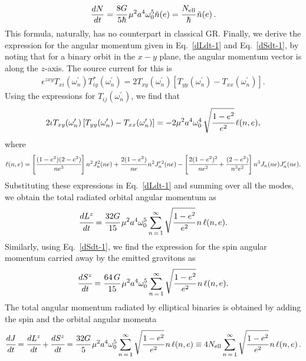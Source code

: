 \documentclass[aps,prd]{revtex4-2}
\begin{document}
\begin{eqnarray}\label{Eq:dN_dt_grav_ellip}
 \frac{dN}{dt} = \cfrac{8G}{5 \hbar}\,\mu^{2}a^{4} \omega_0^{5}\tilde{n}(e) = \cfrac{N_{\rm ell}}{\hbar}\,\tilde{n}(e)\,. 
\end{eqnarray}
 This formula, naturally, has no counterpart in classical GR. Finally, we derive the expression for the angular momentum given in Eq.~\eqref{dLdt-1} and Eq.~\eqref{dSdt-1}, by noting that for a binary orbit in the $x-y$ plane, the angular momentum vector is along the $z$-axis. The source current for this is
\begin{eqnarray}
    \epsilon^{zxy}T_{xi}(\omega^{\prime}_{n})T^{*}_{iy}(\omega^{\prime}_{n}) = 2 T_{xy}(\omega^{\prime}_{n})\left[T_{yy}(\omega^{\prime}_{n})-T_{xx} (\omega^{\prime}_{n}) \right].
\end{eqnarray}
Using the expressions for $T_{ij}(\omega^{\prime}_{n})$, we find that 
\begin{eqnarray}
2\iota T_{xy}(\omega^{\prime}_{n}) \left[T_{yy}(\omega^{\prime}_{n})-T_{xx} (\omega^{\prime}_{n}) \right] = - 2 \mu^2 a^4 \omega_0^4 \,\sqrt{\cfrac{1-e^2}{e^2}}\, \ell(n,e),  
\end{eqnarray}
where 
\begin{eqnarray}
    \ell(n,e) = \left[\cfrac{(1-e^{2})(2-e^{2})}{n e^{3}}\right]n^{2} J^{2}_{n}(ne) + \cfrac{2(1-e^{2})}{ne}\,n^{2} J^{\prime\, 2}_{n}(ne) - \left[\cfrac{2(1-e^{2})^{2}}{n e^{2}} + \cfrac{(2-e^{2})}{n^{3} e^{2}}\right]n^{3} J_{n}(ne) J^{\prime}_{n}(ne).
\end{eqnarray}
Substituting these expressions in Eq.~\eqref{dLdt-1} and summing over all the modes, we obtain the total radiated orbital angular momentum as
\begin{eqnarray}\label{dLdt-4}
\cfrac{dL^z}{dt} =  \cfrac{32G}{15}\,  \mu^{2} a^{4} \omega_{0}^{5} \sum_{n\,=\,1}^\infty \sqrt{\cfrac{1-e^{2}}{e^{2}}}\,n\, \ell(n,e).
\end{eqnarray}
Similarly, using Eq.~\eqref{dSdt-1}, we find the expression for the spin angular momentum carried away by the emitted gravitons as
\begin{eqnarray}\label{dSdt-5}
\cfrac{dS^z}{dt}=  \cfrac{64\,G}{15}\,  \mu^2 a^4 \omega_0^5 \sum_{n\,=\,1}^\infty \sqrt{\cfrac{1-e^{2}}{e^{2}}}\,n\, \ell(n,e). 
\end{eqnarray}
The total angular momentum radiated by elliptical binaries is obtained by adding the spin and the orbital angular momenta
\begin{eqnarray}\label{dGJ}
    \cfrac{dJ}{dt}=\cfrac{dL^z}{dt}+\cfrac{dS^z}{dt}= \cfrac{32G}{5}\,  \mu^2 a^4 \omega_0^5 \sum_{n\,=\,1}^\infty \sqrt{\cfrac{1-e^{2}}{e^{2}}}\, n\, \ell(n,e)  \equiv 4N_{\rm ell}\sum_{n\,=\,1}^\infty \sqrt{\cfrac{1-e^{2}}{e^{2}}}\, n\, \ell(n,e)\,.
\end{eqnarray}
\end{document}
